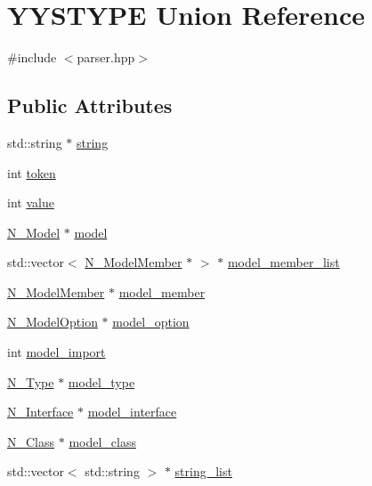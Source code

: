 \hypertarget{unionYYSTYPE}{}\section{Y\+Y\+S\+T\+Y\+P\+E Union Reference}
\label{unionYYSTYPE}


{\ttfamily \#include $<$parser.\+hpp$>$}

\subsection*{Public Attributes}
\begin{DoxyCompactItemize}
\item 
std\+::string $\ast$ \hyperlink{unionYYSTYPE_a4bd606f3c9cec57ee4ba48957509b3f8}{string}
\item 
int \hyperlink{unionYYSTYPE_a01b79e2c4a8e5ec028cca4892559e802}{token}
\item 
int \hyperlink{unionYYSTYPE_acfe61c5751a9282c4ea0d9b345de371b}{value}
\item 
\hyperlink{classN__Model}{N\+\_\+\+Model} $\ast$ \hyperlink{unionYYSTYPE_aa8af89ba8550850302ca1099549db8a9}{model}
\item 
std\+::vector$<$ \hyperlink{classN__ModelMember}{N\+\_\+\+Model\+Member} $\ast$ $>$ $\ast$ \hyperlink{unionYYSTYPE_a504a37d0452901592deb404b4dde2515}{model\+\_\+member\+\_\+list}
\item 
\hyperlink{classN__ModelMember}{N\+\_\+\+Model\+Member} $\ast$ \hyperlink{unionYYSTYPE_a02056d0aa2eaaccc40409baafd79168d}{model\+\_\+member}
\item 
\hyperlink{classN__ModelOption}{N\+\_\+\+Model\+Option} $\ast$ \hyperlink{unionYYSTYPE_af1e284dc24f28c72ea7e0ed867f34e04}{model\+\_\+option}
\item 
int \hyperlink{unionYYSTYPE_a341e3656f8fb6711150f09f741dedd6c}{model\+\_\+import}
\item 
\hyperlink{classN__Type}{N\+\_\+\+Type} $\ast$ \hyperlink{unionYYSTYPE_a2262e4fdf23475305af071cf2dce24f3}{model\+\_\+type}
\item 
\hyperlink{classN__Interface}{N\+\_\+\+Interface} $\ast$ \hyperlink{unionYYSTYPE_a29fba859c02418376ff3bfd6b9750c35}{model\+\_\+interface}
\item 
\hyperlink{classN__Class}{N\+\_\+\+Class} $\ast$ \hyperlink{unionYYSTYPE_af7b370bf86459f13b2ecc2c0732ecaf4}{model\+\_\+class}
\item 
std\+::vector$<$ std\+::string $>$ $\ast$ \hyperlink{unionYYSTYPE_aca50ce01e3307959b0acf7740f490170}{string\+\_\+list}

\end{DoxyCompactItemize}
